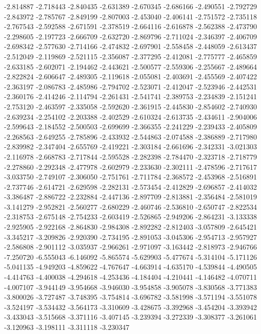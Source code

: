 -2.814887
-2.718443
-2.840435
-2.631389
-2.670345
-2.686166
-2.490551
-2.792729
-2.843972
-2.785767
-2.849199
-2.807003
-2.453040
-2.406141
-2.751572
-2.735118
-2.767543
-2.592588
-2.671591
-2.378519
-2.664116
-2.616878
-2.562388
-2.473790
-2.298605
-2.197723
-2.666709
-2.632720
-2.869796
-2.711024
-2.346397
-2.406709
-2.698342
-2.577630
-2.714166
-2.474832
-2.697901
-2.558458
-2.448059
-2.613437
-2.512049
-2.119869
-2.521115
-2.356087
-2.377295
-2.412081
-2.775777
-2.465859
-2.633185
-2.602071
-2.194462
-2.443621
-2.500577
-2.559306
-2.255667
-2.489664
-2.822824
-2.606647
-2.489305
-2.119618
-2.055081
-2.403691
-2.455569
-2.407422
-2.363197
-2.086783
-2.485986
-2.794702
-2.523071
-2.412047
-2.523946
-2.442531
-2.360176
-2.414246
-2.114794
-2.261431
-2.541741
-2.389753
-2.234839
-2.151241
-2.753120
-2.463597
-2.335058
-2.592620
-2.361915
-2.445830
-2.854602
-2.740930
-2.639234
-2.254102
-2.203388
-2.402529
-2.610324
-2.613735
-2.434611
-2.904006
-2.599643
-2.184552
-2.500503
-2.699699
-2.366355
-2.241229
-2.239433
-2.405809
-2.268563
-2.649255
-2.785896
-2.433932
-2.544863
-2.074588
-2.386889
-2.717980
-2.839982
-2.347404
-2.655769
-2.419221
-2.303184
-2.661696
-2.342331
-3.021303
-2.116978
-2.668783
-2.717844
-2.595528
-2.282398
-2.784470
-2.323718
-2.718779
-2.278860
-2.292348
-2.477978
-2.602979
-2.233630
-2.302111
-2.478596
-2.717617
-3.033750
-2.749107
-2.306050
-2.751761
-2.711784
-2.368572
-2.453968
-2.516891
-2.737746
-2.614721
-2.629598
-2.282131
-2.573454
-2.412829
-2.696857
-2.414032
-3.386487
-2.886722
-2.232884
-2.447136
-2.897709
-2.813881
-2.356484
-2.581019
-3.141279
-2.952821
-2.560277
-2.680229
-2.460746
-2.536810
-2.650747
-2.822534
-2.318753
-2.675148
-2.754233
-2.603419
-2.526865
-2.949206
-2.864231
-3.133338
-2.925905
-2.922168
-2.864830
-2.984308
-2.892282
-2.812403
-3.057809
-2.645421
-3.345217
-3.209826
-2.920390
-2.734195
-2.891053
-3.045306
-2.954713
-2.957927
-2.586808
-2.901112
-3.035937
-2.966261
-2.971097
-3.163442
-2.818973
-2.946766
-7.250720
-6.555043
-6.146092
-5.865574
-5.629903
-5.477674
-5.314104
-5.171126
-5.041135
-4.949203
-4.859622
-4.767647
-4.663914
-4.635170
-4.539844
-4.490505
-4.414763
-4.400038
-4.294618
-4.253436
-4.184404
-4.210441
-4.146482
-4.070711
-4.007107
-3.944149
-3.954668
-3.946030
-3.954858
-3.905078
-3.830568
-3.771383
-3.800026
-3.727487
-3.748395
-3.754814
-3.696782
-3.581998
-3.571194
-3.551078
-3.524197
-3.534432
-3.564173
-3.310609
-3.428675
-3.392968
-3.454204
-3.393942
-3.433043
-3.515668
-3.371116
-3.407145
-3.239394
-3.272339
-3.308377
-3.261061
-3.120963
-3.198111
-3.311118
-3.230347
